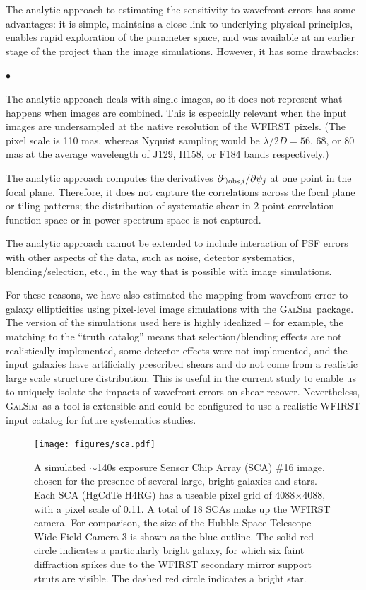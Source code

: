 \documentclass[usenatbib]{mnras}
\newcommand{\galsim}{\textsc{GalSim}}
\begin{document}
The analytic approach to estimating the sensitivity to wavefront errors has some advantages: it is simple, maintains a close link to underlying physical principles, enables rapid exploration of the parameter space, and was available at an earlier stage of the project than the image simulations. However, it has some drawbacks:
\begin{list}{$\bullet$}{}
\item The analytic approach deals with single images, so it does not represent what happens when images are combined. This is especially relevant when the input images are undersampled at the native resolution of the WFIRST pixels. (The pixel scale is 110 mas, whereas Nyquist sampling would be $\lambda/2D = 56$, 68, or 80 mas at the average wavelength of J129, H158, or F184 bands respectively.)
\item The analytic approach computes the derivatives $\partial\gamma_{{\rm obs},i}/\partial\psi_j$ at one point in the focal plane. Therefore, it does not capture the correlations across the focal plane or tiling patterns; the distribution of systematic shear in 2-point correlation function space or in power spectrum space is not captured.
\item The analytic approach cannot be extended to include interaction of PSF errors with other aspects of the data, such as noise, detector systematics, blending/selection, etc., in the way that is possible with image simulations.
\end{list}
For these reasons, we have also estimated the mapping from wavefront error to galaxy ellipticities using pixel-level image simulations with the \galsim\ package. The version of the simulations used here is highly idealized -- for example, the matching to the ``truth catalog'' means that selection/blending effects are not realistically implemented, some detector effects were not implemented, and the input galaxies have artificially prescribed shears and do not come from a realistic large scale structure distribution. This is useful in the current study to enable us to uniquely isolate the impacts of wavefront errors on shear recover. Nevertheless, \galsim\ as a tool is extensible and could be configured to use a realistic WFIRST input catalog for future systematics studies.

\begin{figure}
\begin{center}
\texttt{[image: figures/sca.pdf]}
\end{center}
\caption[]{
A simulated $\sim$140s exposure Sensor Chip Array (SCA) \#16 image, chosen for the presence of several large, bright galaxies and stars. Each SCA (HgCdTe H4RG) has a useable pixel grid of 4088$\times$4088, with a pixel scale of 0.11\arcsec. A total of 18 SCAs make up the WFIRST camera. For comparison, the size of the Hubble Space Telescope Wide Field Camera 3 is shown as the blue outline. The solid red circle indicates a particularly bright galaxy, for which six faint diffraction spikes due to the WFIRST secondary mirror support struts are visible. The dashed red circle indicates a bright star.
\label{fig:sca}}
\end{figure}
\end{document}
